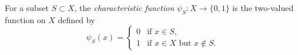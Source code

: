 For a subset $S \subset X$, the \textit{characteristic function} $\psi_S : X \to \{0, 1\}$ is the two-valued function on $X$ defined by
$$
\psi_S(x) =
\begin{cases}
0 & \text{if } x \in S, \\
1 & \text{if } x \in X \text{ but } x \notin S.
\end{cases}
$$
